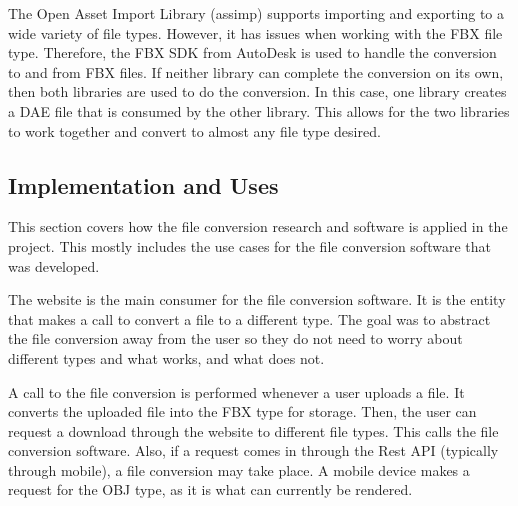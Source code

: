         The Open Asset Import Library (assimp) supports importing and exporting to a wide variety of file types.  However, it has issues when working with the FBX file type.  Therefore, the FBX SDK from AutoDesk is used to handle the conversion to and from FBX files.  If neither library can complete the conversion on its own, then both libraries are used to do the conversion.  In this case, one library creates a DAE file that is consumed by the other library.  This allows for the two libraries to work together and convert to almost any file type desired.

    \subsection{Implementation and Uses}

        This section covers how the file conversion research and software is applied in the project.  This mostly includes the use cases for the file conversion software that was developed.

        The website is the main consumer for the file conversion software.  It is the entity that makes a call to convert a file to a different type.  The goal was to abstract the file conversion away from the user so they do not need to worry about different types and what works, and what does not.  
            
        A call to the file conversion is performed whenever a user uploads a file.  It converts the uploaded file into the FBX type for storage.  Then, the user can request a download through the website to different file types.  This calls the file conversion software.  Also, if a request comes in through the Rest API (typically through mobile), a file conversion may take place.  A mobile device makes a request for the OBJ type, as it is what can currently be rendered.

